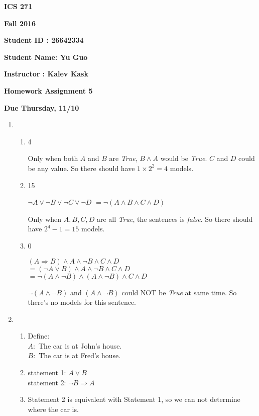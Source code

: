 \documentclass{article}
\begin{document}
{\bf ICS 271}

{\bf Fall 2016}

{\bf Student ID : 26642334}

{\bf Student Name: Yu Guo}

{\bf Instructor : Kalev Kask}

{\bf Homework Assignment 5}

{\bf Due Thursday, 11/10}




\begin{enumerate}

\item
	\begin{enumerate}
		\item 4

		Only when both $A$ and $B$ are \textit{True}, $B \land A$ would be \textit{True}. $C$ and $D$ could be any value. So there should have $1 \times 2^2 = 4$ models.

		\item 15

		$\neg A \lor \neg B \lor \neg C \lor \neg D$ 
		$= \neg(A \land B \land C \land D)$

		Only when $A,B,C,D$ are all \textit{True}, the sentences is \textit{false}. So there should have $2^4-1=15$ models.

		\item 0

		$(A \Rightarrow B) \land A \land \neg B \land C \land D$ \\
		$ = (\neg A \lor B) \land A \land \neg B \land C \land D$ \\
		$ = \neg (A \land \neg B) \land (A \land \neg B) \land C \land D$

		$\neg (A \land \neg B)$ and $(A \land \neg B)$ could NOT be \textit{True} at same time. So there's no models for this sentence.
	\end{enumerate}


\item
	\begin{enumerate}
		\item Define: \\
		$A:$ The car is at John's house. \\
		$B:$ The car is at Fred's house. 

		\item statement 1: $A \lor B$ \\
		statement 2: $\neg B \Rightarrow A$

		\item Statement 2 is equivalent with Statement 1, so we can not determine where the car is.
	\end{enumerate}


\end{enumerate}
\end{document}
